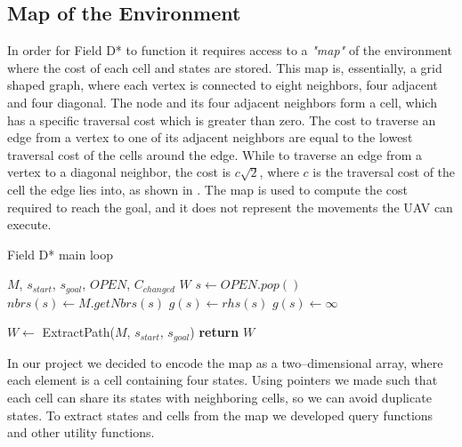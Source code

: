 \newpage

\subsection{Map of the Environment}

In order for Field D* to function it requires access to a \emph{"map"} of the environment
where the cost of each cell and states are stored. This map is, essentially, a grid shaped
graph, where each vertex is connected to eight neighbors, four adjacent and four diagonal. 
The node and its four adjacent neighbors form a cell, which has a specific traversal cost which
is greater than zero. The cost to traverse an edge from a vertex to one of its adjacent neighbors
are equal to the lowest traversal cost of the cells around the edge. While to traverse an edge
from a vertex to a diagonal neighbor, the cost is $c \sqrt{2}$, where $c$ is the traversal cost
of the cell the edge lies into, as shown in \autocite{DF06}. The map is used to compute the 
cost required to reach the goal, and it does not represent the movements the UAV can execute. 

\begin{algorithm}
	\algrenewcommand{}
	\algrenewcommand{}
	\caption{Field D* main loop}\label{alg:fds-loop}
	\begin{algorithmic}[1]
		\Require $M$, $s_{start}$, $s_{goal}$, $OPEN$, $C_{changed}$
		\Ensure $W$
				\State {}
			\EndFor
		\EndFor
			\State $s \gets OPEN.pop()$
			\State $nbrs(s) \gets M.getNbrs(s)$
				\State $g(s) \gets rhs(s)$ 
					\State {}
				\EndFor
			\Else
				\State $g(s) \gets \infty$
					\State {}
				\EndFor

			\EndIf
		\EndWhile
		\State $W \gets $ ExtractPath($M$, $s_{start}$, $s_{goal}$)
		\State \textbf{return} $W$
	\end{algorithmic}
\end{algorithm}

In our project we decided to encode the map as a two--dimensional array, where each element is 
a cell containing four states. Using pointers we made such that each cell can share its states
with neighboring cells, so we can avoid duplicate states. To extract states and cells from the 
map we developed query functions and other utility functions. 


